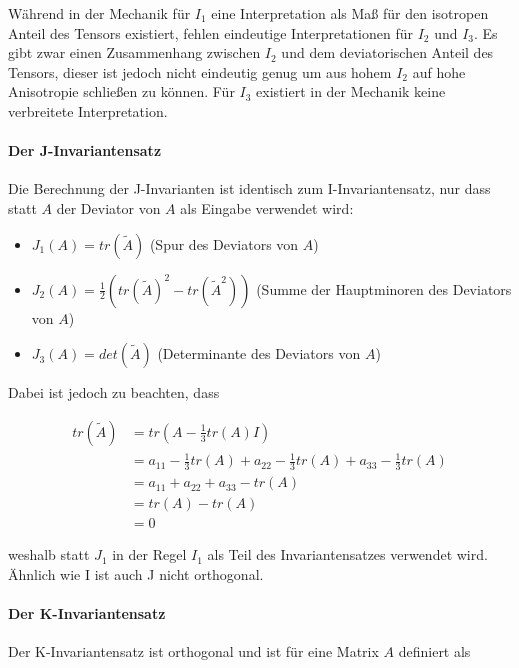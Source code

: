 \documentclass[a4paper,fontsize=12pt,toc=bib,parskip=half,ngerman]{scrartcl}
\begin{document}
W\"ahrend in der Mechanik f\"ur $I_1$ eine Interpretation als Ma{\ss} f\"ur den isotropen Anteil des Tensors existiert, fehlen eindeutige Interpretationen f\"ur $I_2$ und $I_3$. Es gibt zwar einen Zusammenhang zwischen $I_2$ und dem deviatorischen Anteil des Tensors, dieser ist jedoch nicht eindeutig genug um aus hohem $I_2$ auf hohe Anisotropie schlie{\ss}en zu k\"onnen. F\"ur $I_3$ existiert in der Mechanik keine verbreitete Interpretation. 

\paragraph{Der J-Invariantensatz}

Die Berechnung der J-Invarianten ist identisch zum I-Invarian\-ten\-satz, nur dass statt $A$ der Deviator von $A$ als Eingabe verwendet wird:

\begin{itemize}
	\item $J_1(A) = tr(\tilde{A})$ (Spur des Deviators von $A$)
	\item $J_2(A) = \frac{1}{2}(tr(\tilde{A})^2 - tr(\tilde{A}^2))$ (Summe der Hauptminoren des Deviators von $A$)
\item $J_3(A) = det(\tilde{A})$ (Determinante des Deviators von $A$)
\end{itemize}

Dabei ist jedoch zu beachten, dass

\begin{equation}
	\begin{split}
	tr(\tilde{A}) &= tr(A - \frac{1}{3}tr(A)I)\\
	&= a_{11} - \frac{1}{3} tr(A) + a_{22} - \frac{1}{3} tr(A) + a_{33} - \frac{1}{3} tr(A)\\
	&= a_{11} + a_{22} + a_{33} - tr(A)\\
	&= tr(A) - tr(A)\\
	&= 0
	\end{split}
\end{equation}

weshalb statt $J_1$ in der Regel $I_1$ als Teil des Invariantensatzes verwendet wird. \"Ahnlich wie I ist auch J nicht orthogonal.

\paragraph{Der K-Invariantensatz}
Der K-Invariantensatz ist orthogonal und ist f\"ur eine Matrix $A$ definiert als
\end{document}
